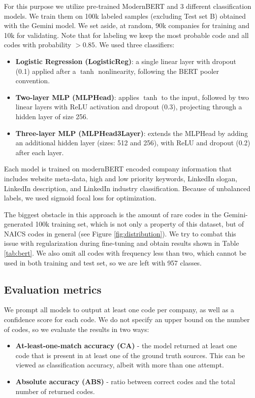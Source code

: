 \documentclass[fleqn,moreauthors,10pt]{ds_report}
\begin{document}
For this purpose we utilize pre-trained ModernBERT \cite{modernbert} and 3 different classification models. We train them on 100k labeled samples (excluding Test set B) obtained with the Gemini model. We set aside, at random, 90k companies for training and 10k for validating. Note that for labeling we keep the most probable code and all codes with probability $> 0.85$. We used three classifiers:
\begin{itemize}
    \item \textbf{Logistic Regression (LogisticReg)}: a single linear layer with dropout (0.1) applied after a $\tanh$ nonlinearity, following the BERT pooler convention.
    \item \textbf{Two-layer MLP (MLPHead)}: applies $\tanh$ to the input, followed by two linear layers with ReLU activation and dropout (0.3), projecting through a hidden layer of size 256.
    \item \textbf{Three-layer MLP (MLPHead3Layer)}: extends the MLPHead by adding an additional hidden layer (sizes: 512 and 256), with ReLU and dropout (0.2) after each layer. 
\end{itemize}

Each model is trained on modernBERT \cite{modernbert} encoded company information that includes website meta-data, high and low priority keywords, LinkedIn slogan, LinkedIn description, and LinkedIn industry classification. Because of unbalanced labels, we used sigmoid focal loss for optimization. 

The biggest obstacle in this approach is the amount of rare codes in the Gemini-generated 100k training set, which is not only a property of this dataset, but of NAICS codes in general (see Figure \ref{fig:distribution}). We try to combat this issue with regularization during fine-tuning and obtain results shown in Table \ref{tab:bert}. We also omit all codes with frequency less than two, which cannot be used in both training and test set, so we are left with 957 classes. 

\subsection*{Evaluation metrics}

We prompt all models to output at least one code per company, as well as a confidence score for each code. We do not specify an upper bound on the number of codes, so we evaluate the results in two ways:

\begin{itemize}
    \item \textbf{At-least-one-match accuracy (CA)} - the model returned at least one code that is present in at least one of the ground truth sources. This can be viewed as classification accuracy, albeit with more than one attempt.
    \item \textbf{Absolute accuracy (ABS)} - ratio between correct codes and the total number of returned codes.
\end{itemize}
\end{document}
